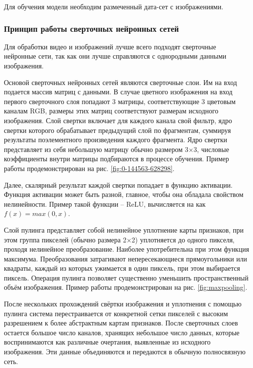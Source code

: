 \documentclass[a4paper,14pt]{article}
\begin{document}
	Для обучения модели необходим размеченный дата-сет с изображениями.
	
	\subsubsection{Принцип работы сверточных нейронных сетей}
	
	Для обработки видео и изображений лучше всего подходят сверточные нейронные сети, так как они лучше справляются с однородными данными изображения.
	
	Основой сверточных нейронных сетей являются сверточные слои.
	Им на вход подается массив матриц с данными.
	В случае цветного изображения на вход первого сверточного слоя попадают 3 матрицы, соответствующие 3 цветовым каналам RGB, размеры этих матриц соответствуют размерам исходного изображения.
	Слой свертки включает для каждого канала свой фильтр, ядро свертки которого обрабатывает предыдущий слой по фрагментам, суммируя результаты поэлементного произведения каждого фрагмента.
	Ядро свертки представляет из себя небольшую матрицу обычно размером 3×3, числовые коэффициенты внутри матрицы подбираются в процессе обучения.
	Пример работы продемонстрирован на рис. \ref{fig:0-144563-628298}.
	
	Далее, скалярный результат каждой свертки попадает в функцию активации.
	Функция активации может быть разной, главное, чтобы она обладала свойством нелинейности.
	Пример такой функции -- ReLU, вычисляется на как $f(x) = max(0,x)$.
	
	Слой пулинга представляет собой нелинейное уплотнение карты признаков, при этом группа пикселей (обычно размера 2×2) уплотняется до одного пикселя, проходя нелинейное преобразование.
	Наиболее употребительна при этом функция максимума.
	Преобразования затрагивают непересекающиеся прямоугольники или квадраты, каждый из которых ужимается в один пиксель, при этом выбирается пиксель.
	Операция пулинга позволяет существенно уменьшить пространственный объём изображения. 
	Пример работы продемонстрирован на рис. \ref{fig:maxpooling}.
	
	После нескольких прохождений свёртки изображения и уплотнения с помощью пулинга система перестраивается от конкретной сетки пикселей с высоким разрешением к более абстрактным картам признаков.
	После сверточных слоев остается большое число каналов, хранящих небольшое число данных, которые воспринимаются как различные очертания, выявленные из исходного изображения.
	Эти данные объединяются и передаются в обычную полносвязную сеть.
	
\end{document}
